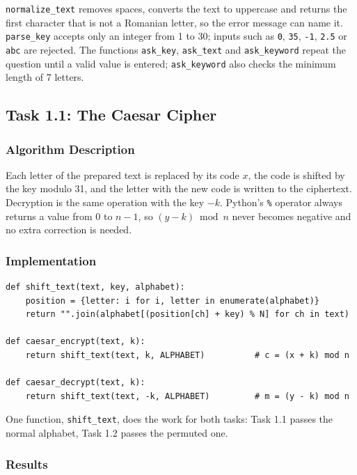 \documentclass[12pt,a4paper]{article}
\begin{document}
\texttt{normalize\_text} removes spaces, converts the text to uppercase and returns the
first character that is not a Romanian letter, so the error message can name it.
\texttt{parse\_key} accepts only an integer from 1 to 30; inputs such as \texttt{0},
\texttt{35}, \texttt{-1}, \texttt{2.5} or \texttt{abc} are rejected. The functions
\texttt{ask\_key}, \texttt{ask\_text} and \texttt{ask\_keyword} repeat the question until a
valid value is entered; \texttt{ask\_keyword} also checks the minimum length of 7 letters.

\subsection{Task 1.1: The Caesar Cipher}

\subsubsection{Algorithm Description}

Each letter of the prepared text is replaced by its code $x$, the code is shifted by the key
modulo 31, and the letter with the new code is written to the ciphertext. Decryption is the
same operation with the key $-k$. Python's \texttt{\%} operator always returns a value from
0 to $n-1$, so $(y - k) \bmod n$ never becomes negative and no extra correction is needed.

\subsubsection{Implementation}

\begin{lstlisting}[caption={Shift over an alphabet and the classic Caesar cipher}]
def shift_text(text, key, alphabet):
    position = {letter: i for i, letter in enumerate(alphabet)}
    return "".join(alphabet[(position[ch] + key) % N] for ch in text)

def caesar_encrypt(text, k):
    return shift_text(text, k, ALPHABET)          # c = (x + k) mod n

def caesar_decrypt(text, k):
    return shift_text(text, -k, ALPHABET)         # m = (y - k) mod n
\end{lstlisting}

One function, \texttt{shift\_text}, does the work for both tasks: Task 1.1 passes the normal
alphabet, Task 1.2 passes the permuted one.

\subsubsection{Results}
\end{document}
